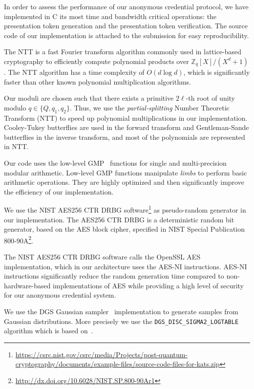 In order to assess the performance of our anonymous credential protocol, we have implemented in C its most time and bandwidth critical operations: the presentation token generation and the presentation token verification. The source code of our implementation is attached to the submission for easy reproducibility.

The NTT is a fast Fourier transform algorithm commonly used in lattice-based cryptography to efficiently compute polynomial products over $\mathbb{Z}_q[X]/(X^d+1)$. The NTT algorithm has a time complexity of $O(d \log d)$, which is significantly faster than other known polynomial multiplication algorithms.

Our moduli are chosen such that there exists a primitive $2\ell$-th root of unity modulo $q \in \{Q, q_1, q_2\}$. Thus, we use the \emph{partial-splitting} Number Theoretic Transform (NTT) to speed up polynomial multiplications in our implementation. Cooley-Tukey butterflies are used in the forward transform and Gentleman-Sande butterflies in the inverse transform, and most of the polynomials are represented in NTT.

Our code uses the low-level GMP~\cite{gmp} functions for single and multi-precision modular arithmetic. Low-level GMP functions manipulate \emph{limbs} to perform basic arithmetic operations. They are highly optimized and then significantly improve the efficiency of our implementation.

We use the NIST AES256 CTR DRBG software\footnote{\url{https://csrc.nist.gov/csrc/media/Projects/post-quantum-cryptography/documents/example-files/source-code-files-for-kats.zip}} as pseudo-random generator in our implementation. The AES256 CTR DRBG is a deterministic random bit generator, based on the AES block cipher, specified in NIST Special Publication 800-90A\footnote{\url{http://dx.doi.org/10.6028/NIST.SP.800-90Ar1}}.

The NIST AES256 CTR DRBG software calls the OpenSSL AES implementation, which in our architecture uses the AES-NI instructions. AES-NI instructions significantly reduce the random generation time compared to non-hardware-based implementations of AES while providing a high level of security for our anonymous credential system.

We use the DGS Gaussian sampler~\cite{dgs} implementation to generate samples from Gaussian distributions. More precisely we use the \texttt{DGS\_DISC\_SIGMA2\_LOGTABLE} algorithm which is based on~\cite[Algorithm 12]{C:DDLL13}.

